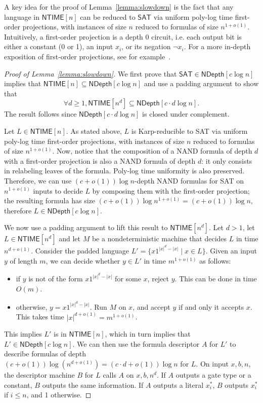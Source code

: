 \documentclass[a4paper, 11pt]{article}
\theoremstyle{plain}
\theoremstyle{definition}
\theoremstyle{remark}
\newcommand{\NTIME}{\textsf{NTIME}}%
\newcommand{\SAT}{\textsf{SAT}}%
\newcommand{\ND}{\textsf{NDepth}}%
\newcommand{\NDL}[1]{\ND\left[ #1 \log n\right]}%
\begin{document}
A key idea for the proof of Lemma~\ref{lemma:slowdown} 
is the fact that any language in $\NTIME[n]$ can
be reduced to $\SAT{}$ via uniform poly-log time first-order projections, 
with instances of size $n$ reduced to formulas of size $n^{1+o(1)}$.
Intuitively, a first-order projection is a depth 0 circuit, 
i.e. each output bit is either a constant (0 or 1),
an input $x_i$, or its negation $\neg x_i$.
For a more in-depth exposition of first-order projections,
see for example~\cite[End of Sec.~3]{allender1997first}.
\begin{proof}[Proof of Lemma~\ref{lemma:slowdown}]
	We first prove that $\SAT{}\in \NDL{c}$ implies that $\NTIME[n] \subseteq \NDL{c}$
	and use a padding argument to show that 
	\[\forall d\ge 1, \NTIME[n^d] \subseteq \NDL{c\cdot d}.\]
	The result follows since $\NDL{c\cdot d}$ is closed under complement.

	Let $L\in\NTIME[n]$. 
	As stated above, $L$ is Karp-reducible to \SAT{} via
	uniform poly-log time first-order projections, 
	with instances of size $n$ reduced to formulas of size $n^{1+o(1)}$.
	Now, notice that the composition of a NAND formula of depth $d$ with a first-order projection
	is also a NAND formula of depth $d$: it only consists in relabeling leaves of the formula.
	Poly-log time uniformity is also preserved. 
	Therefore, we can use $(c+o(1)) \log n$-depth NAND formulas for \SAT{} on $n^{1+o(1)}$
	inputs to decide $L$ by composing them with the first-order projection; 
	the resulting formula has size $(c+o(1)) \log n^{1+o(1)} = (c+o(1)) \log n$,
	therefore $L\in\NDL{c}$.

	We now use a padding argument to lift this result to $\NTIME[n^d]$.
	Let $d>1$, let $L\in \NTIME[n^d]$ and let $M$ be a nondeterministic machine that decides $L$
	in time $n^{d+o(1)}$.
	Consider the padded language $L' = \{x1^{|x|^d - |x|} \mid x\in L\}$.
	Given an input $y$ of length $m$, we can decide whether $y\in L'$ in time 
	$m^{1+o(1)}$ as follows:
	\begin{itemize}
		\item if $y$ is not of the form $x1^{|x|^d - |x|}$ for some $x$, reject $y$.
		This can be done in time $O(m)$.
		\item otherwise, $y = x1^{|x|^d - |x|}$. Run $M$ on $x$, and accept $y$ 
		if and only it accepts $x$. This takes time $|x|^{d+o(1)} = m^{1+o(1)}$.
	\end{itemize}
	This implies $L'$ is in $\NTIME[n]$, which in turn implies that $L'\in\NDL{c}$.
	We can then use the formula descriptor $A$ for $L'$ 
	to describe formulas of depth $(c + o(1))\log \left(n^{d+o(1)}\right) = (c\cdot d + o(1))\log n$ for $L$.
	On input $x,b,n$, the descriptor machine $B$ for $L$  
	calls $A$ on $x, b, n^d$.
	If $A$ outputs a gate type or a constant, $B$ outputs the same information.
	If $A$ outputs a literal $x_i^*$, $B$ outputs $x_i^*$ if $i \le n$, and 1 otherwise.
\end{proof}
\end{document}
